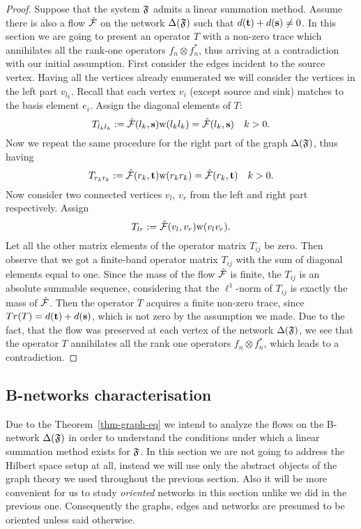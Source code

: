 \documentclass[12pt]{article}
\begin{document}
\begin{proof}
      Suppose that the system $\mathfrak{F}$ admits a linear summation method.
      Assume there is also a flow $\mathcal{\hat{F}}$ on the network $\Delta(\mathfrak{F})$ such that $d(\mathbf{t}) + d(\mathbf{s}) \neq 0$.
      In this section we are going to present an operator $T$ with a non-zero trace which annihilates all the rank-one
      operators $f_n \otimes f^*_n$, thus arriving at a contradiction with our initial assumption.
      First consider the edges incident to the source vertex.
      Having all the vertices already enumerated we will consider the vertices in the left part $v_{l_k}$.
      Recall that each vertex $v_i$ (except source and sink) matches to the basis element $e_i$.
      Assign the diagonal elements of $T$:
      \[
        T_{l_k l_k} := \mathcal{\hat{F}}(l_k, \mathbf{s}) \mathrm{w}(l_k l_k) = \mathcal{\hat{F}}(l_k, \mathbf{s}) \quad k > 0.
      \]
      Now we repeat the same procedure for the right part of the graph $\Delta(\mathfrak{F})$, thus having
      \[
        T_{r_k r_k} := \mathcal{\hat{F}}(r_k, \mathbf{t}) \mathrm{w}(r_k r_k) = \mathcal{\hat{F}}(r_k, \mathbf{t}) \quad k > 0.
      \]
      Now consider two connected vertices $v_l$, $v_r$ from the left and right part
        respectively. Assign
      \[
        T_{lr} := \mathcal{\hat{F}}(v_l, v_r) \mathrm{w}(v_l  v_r).
      \]
      Let all the other matrix elements of the operator matrix $T_{ij}$ be zero.
      Then observe that we got a finite-band operator matrix $T_{ij}$ with the sum of diagonal elements
      equal to one.
      Since the mass of the flow $\mathcal{\hat{F}}$ is finite, the $T_{ij}$ is an absolute summable sequence, considering that
        the $\ell^1$-norm of $T_{ij}$ is exactly the mass of $\mathcal{\hat{F}}$.
      Then the operator $T$ acquires a finite non-zero trace, since $Tr(T) = d(\mathbf{t}) + d(\mathbf{s})$, which is not zero
        by the assumption we made.
      Due to the fact, that the flow was preserved at each vertex of the network $\Delta(\mathfrak{F})$,
        we see that the operator $T$ annihilates all the rank one operators $f_n \otimes f^*_n$,
        which leads to a contradiction.
    \end{proof}

  \subsection{B-networks characterisation}
    Due to the Theorem~\ref{thm-graph-eq} we intend to analyze the flows on the B-network
      $\Delta(\mathfrak{F})$ in order to understand the conditions under which a linear
      summation method exists for $\mathfrak{F}$.
    In this section we are not going to address the Hilbert space setup at all,
      instead we will use only the abstract objects of the graph theory
      we used throughout the previous section.
    Also it will be more convenient for us to study \emph{oriented} networks in this section unlike we
      did in the previous one.
    Consequently the graphs, edges and networks are presumed to be oriented unless said otherwise.
\end{document}

